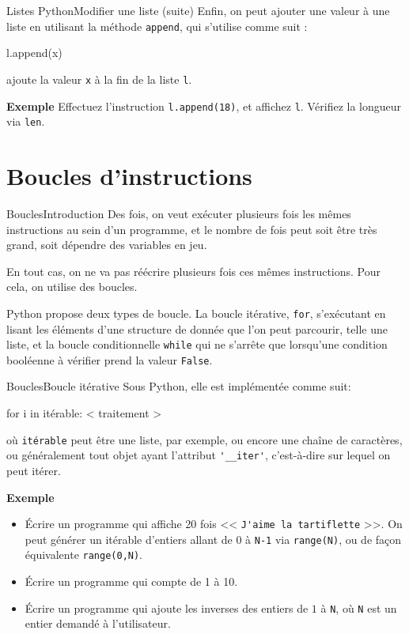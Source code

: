 \documentclass[10pt]{beamer}
\begin{document}
\begin{frame}[fragile]{Listes Python}{Modifier une liste (suite)}
	Enfin, on peut ajouter une valeur à une liste en utilisant la méthode \verb|append|, qui s'utilise comme suit : \begin{semiverbatim}l.append(x)\end{semiverbatim}
	ajoute la valeur \verb|x| à la fin de la liste \verb|l|.
	
	\begin{block}{\textbf{Exemple}}
		Effectuez l'instruction \verb|l.append(18)|, et affichez \verb|l|. Vérifiez la longueur via \verb|len|.
	\end{block}
\end{frame}

\section{Boucles d'instructions}

\begin{frame}[fragile]{Boucles}{Introduction}
	Des fois, on veut exécuter plusieurs fois les mêmes instructions au sein d'un programme, et le nombre de fois peut soit être très grand, soit dépendre des variables en jeu.
	\pause
	
	En tout cas, on ne va pas réécrire plusieurs fois ces mêmes instructions. Pour cela, on utilise des boucles.
	\pause
	
	Python propose deux types de boucle. La boucle itérative, \verb|for|, s'exécutant en lisant les éléments d'une structure de donnée que l'on peut parcourir, telle une liste, et la boucle conditionnelle \verb|while| qui ne s'arrête que lorsqu'une condition booléenne à vérifier prend la valeur \verb|False|.
\end{frame}

\begin{frame}[fragile]{Boucles}{Boucle itérative}
	Sous Python, elle est implémentée comme suit:
	\begin{semiverbatim}for i in itérable:
    < traitement >\end{semiverbatim}
	où \verb|itérable| peut être une liste, par exemple, ou encore une chaîne de caractères, ou généralement tout objet ayant l'attribut \verb|'__iter'|, c'est-à-dire sur lequel on peut itérer.
	\pause
	
	\begin{block}{\textbf{Exemple}}
		\begin{itemize}[<+->]
		\item Écrire un programme qui affiche 20 fois << \verb|J'aime la tartiflette| >>. On peut générer un itérable d'entiers allant de 0 à \verb|N-1| via \verb|range(N)|, ou de façon équivalente \verb|range(0,N)|.
		
		\item Écrire un programme qui compte de 1 à 10.
		
		\item Écrire un programme qui ajoute les inverses des entiers de $1$ à \verb|N|, où \verb|N| est un entier demandé à l'utilisateur.
		\end{itemize}
	\end{block}
\end{frame}
\end{document}
